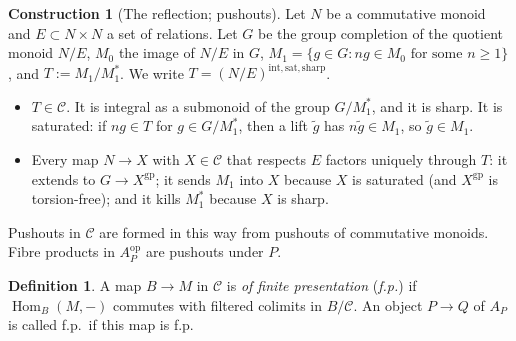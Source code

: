 \documentclass[11pt]{article}
\theoremstyle{definition}
\newtheorem{definition}[theorem]{Definition}
\newtheorem{construction}[theorem]{Construction}
\theoremstyle{remark}
\newcommand{\cC}{\mathcal{C}}
\newcommand{\gp}{\mathrm{gp}}
\newcommand{\Hom}{\operatorname{Hom}}
\newcommand{\rfl}{\mathrm{int,sat,sharp}}
\begin{document}
\begin{construction}[The reflection; pushouts]\label{con:refl}
Let $N$ be a commutative monoid and $E\subset N\times N$ a set of relations. Let $G$ be the group completion of the quotient monoid $N/E$, $M_0$ the image of $N/E$ in $G$, $M_1=\{g\in G: ng\in M_0\text{ for some }n\ge1\}$, and $T:=M_1/M_1^*$. We write $T=(N/E)^{\rfl}$.
\begin{itemize}
\item $T\in\cC$. It is integral as a submonoid of the group $G/M_1^*$, and it is sharp. It is saturated: if $ng\in T$ for $g\in G/M_1^*$, then a lift $\tilde g$ has $n\tilde g\in M_1$, so $\tilde g\in M_1$.
\item Every map $N\to X$ with $X\in\cC$ that respects $E$ factors uniquely through $T$: it extends to $G\to X^{\gp}$; it sends $M_1$ into $X$ because $X$ is saturated (and $X^{\gp}$ is torsion-free); and it kills $M_1^*$ because $X$ is sharp.
\end{itemize}
Pushouts in $\cC$ are formed in this way from pushouts of commutative monoids. Fibre products in $A_P^{\mathrm{op}}$ are pushouts under $P$.
\end{construction}

\begin{definition}\label{def:fp}
A map $B\to M$ in $\cC$ is \emph{of finite presentation} (\emph{f.p.}) if $\Hom_B(M,-)$ commutes with filtered colimits in $B/\cC$. An object $P\to Q$ of $A_P$ is called f.p.\ if this map is f.p.
\end{definition}
\end{document}
